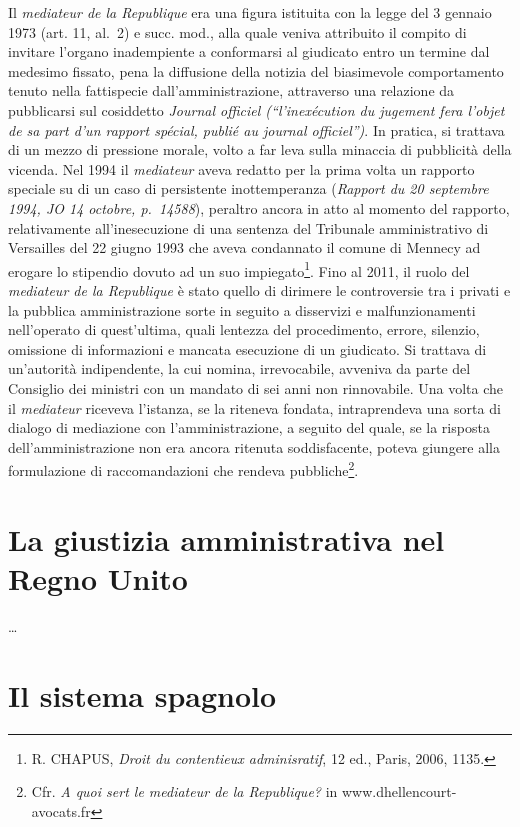 \documentclass[12pt,it,a4paper,]{report}
\begin{document}
Il \emph{mediateur de la Republique} era una figura istituita con la
legge del 3 gennaio 1973 (art. 11, al.~2) e succ. mod., alla quale
veniva attribuito il compito di invitare l'organo inadempiente a
conformarsi al giudicato entro un termine dal medesimo fissato, pena la
diffusione della notizia del biasimevole comportamento tenuto nella
fattispecie dall'amministrazione, attraverso una relazione da
pubblicarsi sul cosiddetto \emph{Journal officiel (``l'inexécution du
jugement fera l'objet de sa part d'un rapport spécial, publié au journal
officiel'')}. In pratica, si trattava di un mezzo di pressione morale,
volto a far leva sulla minaccia di pubblicità della vicenda. Nel 1994 il
\emph{mediateur} aveva redatto per la prima volta un rapporto speciale
su di un caso di persistente inottemperanza (\emph{Rapport du 20
septembre 1994, JO 14 octobre, p.~14588}), peraltro ancora in atto al
momento del rapporto, relativamente all'inesecuzione di una sentenza del
Tribunale amministrativo di Versailles del 22 giugno 1993 che aveva
condannato il comune di Mennecy ad erogare lo stipendio dovuto ad un suo
impiegato\footnote{R. CHAPUS, \emph{Droit du contentieux adminisratif},
  12 ed., Paris, 2006, 1135.}. Fino al 2011, il ruolo del
\emph{mediateur de la Republique} è stato quello di dirimere le
controversie tra i privati e la pubblica amministrazione sorte in
seguito a disservizi e malfunzionamenti nell'operato di quest'ultima,
quali lentezza del procedimento, errore, silenzio, omissione di
informazioni e mancata esecuzione di un giudicato. Si trattava di
un'autorità indipendente, la cui nomina, irrevocabile, avveniva da parte
del Consiglio dei ministri con un mandato di sei anni non rinnovabile.
Una volta che il \emph{mediateur} riceveva l'istanza, se la riteneva
fondata, intraprendeva una sorta di dialogo di mediazione con
l'amministrazione, a seguito del quale, se la risposta
dell'amministrazione non era ancora ritenuta soddisfacente, poteva
giungere alla formulazione di raccomandazioni che rendeva
pubbliche\footnote{Cfr. \emph{A quoi sert le mediateur de la
  Republique?} in www.dhellencourt-avocats.fr}.

\hypertarget{la-giustizia-amministrativa-nel-regno-unito}{%
\chapter{La giustizia amministrativa nel Regno
Unito}\label{la-giustizia-amministrativa-nel-regno-unito}}

\ldots{}

\hypertarget{il-sistema-spagnolo}{%
\chapter{Il sistema spagnolo}\label{il-sistema-spagnolo}}
\end{document}
